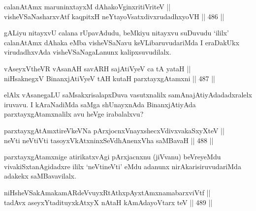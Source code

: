 
\begin{shl}
calanAtAmx maruninxtayxM dAhakoV\s ginxritiVriteV || \\
visheVSaNasharxvAtf kaqpitxH neYtayoVsatxdivxrudadhxyoVH \hfill || 486 ||  
\end{shl}

\begin{artha}
gALiyu nitayxvU calana rUpavAdudu, beMkiyu nitayxvu suDuvudu `ililx'
calanAtAmx dAhaka eMba visheVSaNavu keVLibaruvudariMda I eraDakUkx
virudadhxvAda visheVSaNagaLanunx kalipxsuvudilalx.
\end{artha}


\begin{shl}
vAseyxV\s theVR vAsanAH savARH sajAtiVyeV ca tA yataH || \\
niHsaknegxV BinanxjAtiVyeV tAH kutaH parxtayxgAtamxni \hfill || 487 ||  
\end{shl}

\begin{artha}
elAlx vAsanegaLU saMsakxrisalapxDuva vasutxnalilx
samAnajAtiyAdadadxralelx iruvavu. I kAraNadiMda saMga shUnayxnAda
BinanxjAtiyAda parxtayxgAtamxnalilx avu heVge irabalalxvu?
\end{artha}

\begin{shl}
parxtayxgAtAmxtireVkeVNa pArxjocnxV\s nayxshecxVdivxvakaSxyXteV || \\
neVti neVtiVti tasoyxVkAtxninxSeVdhAnenxVha saMBavaH \hfill || 488 ||  
\end{shl}

\begin{artha}
parxtayxgAtamxnige atirikatxvAgi pArxjacnxnu (jiVvanu) beVreyeMdu
vivakiSxtanAgidadxre ililx `neVtineVti' eMdu adanunx
nirAkarisiruvudariMda adakekx saMBavavilalx.
\end{artha}


\begin{shl}
niHsheVSakAmakamARdeVvuyxRtAthxpAyx\s \s tAmxnamabarxviVtf || \\
tadAvx aseyxYtadituyxkAtxyX nAtaH kAmAdayoV\s tarx teV \hfill || 489 ||  
\end{shl}

